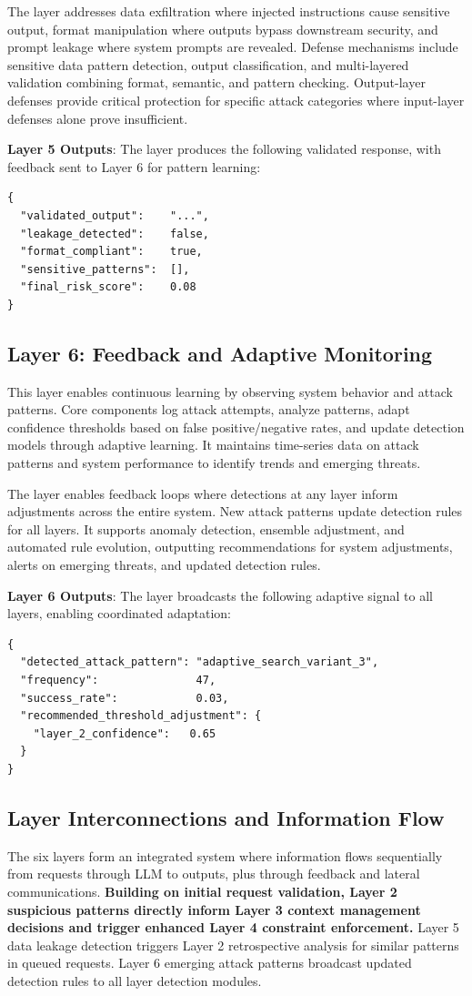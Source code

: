 \documentclass[conference]{IEEEtran}
\begin{document}
The layer addresses data exfiltration where injected instructions cause sensitive output, format manipulation where outputs bypass downstream security, and prompt leakage where system prompts are revealed. Defense mechanisms include sensitive data pattern detection, output classification, and multi-layered validation combining format, semantic, and pattern checking. Output-layer defenses provide critical protection for specific attack categories where input-layer defenses alone prove insufficient.

\textbf{Layer 5 Outputs}: The layer produces the following validated response, with feedback sent to Layer 6 for pattern learning:
\begin{lstlisting}[style=jsonoutput]
{
  "validated_output":    "...",
  "leakage_detected":    false,
  "format_compliant":    true,
  "sensitive_patterns":  [],
  "final_risk_score":    0.08
}
\end{lstlisting}

\subsection{Layer 6: Feedback and Adaptive Monitoring}
This layer enables continuous learning by observing system behavior and attack patterns. Core components log attack attempts, analyze patterns, adapt confidence thresholds based on false positive/negative rates, and update detection models through adaptive learning. It maintains time-series data on attack patterns and system performance to identify trends and emerging threats.

The layer enables feedback loops where detections at any layer inform adjustments across the entire system. New attack patterns update detection rules for all layers. It supports anomaly detection, ensemble adjustment, and automated rule evolution, outputting recommendations for system adjustments, alerts on emerging threats, and updated detection rules.

\textbf{Layer 6 Outputs}: The layer broadcasts the following adaptive signal to all layers, enabling coordinated adaptation:
\begin{lstlisting}[style=jsonoutput]
{
  "detected_attack_pattern": "adaptive_search_variant_3",
  "frequency":               47,
  "success_rate":            0.03,
  "recommended_threshold_adjustment": {
    "layer_2_confidence":   0.65
  }
}
\end{lstlisting}

\subsection{Layer Interconnections and Information Flow}
The six layers form an integrated system where information flows sequentially from requests through LLM to outputs, plus through feedback and lateral communications. \textbf{Building on initial request validation, Layer 2 suspicious patterns directly inform Layer 3 context management decisions and trigger enhanced Layer 4 constraint enforcement.} Layer 5 data leakage detection triggers Layer 2 retrospective analysis for similar patterns in queued requests. Layer 6 emerging attack patterns broadcast updated detection rules to all layer detection modules.
\end{document}

